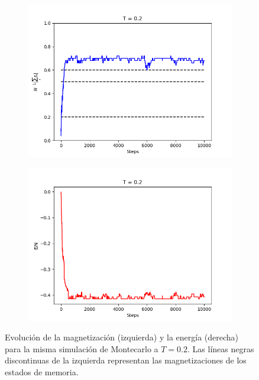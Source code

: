 \documentclass[titlepage,12pt]{article}
\numberwithin{equation}{section}
\begin{document}
	\begin{figure}[H]
	    \centering
	    \begin{subfigure}{.45\textwidth}
	    \centering
	    \includegraphics[width=\linewidth]{magnet_meta_T=0,2.png}
	    \end{subfigure}%
	    \begin{subfigure}{.45\linewidth}
	    \centering
	    \includegraphics[width=\linewidth]{ener_meta_T=0,2.png}
	    \end{subfigure}%
	    \caption{Evolución de la magnetización (izquierda) y la energía (derecha) para la misma simulación de Montecarlo a $T = 0.2$. Las líneas negras discontinuas de la izquierda representan las magnetizaciones de los estados de memoria.}
	    \label{meta-T=0.2}
	\end{figure}
\end{document}
